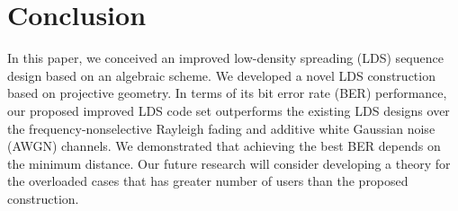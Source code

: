 \documentclass[journal,comsoc]{IEEEtran}
\begin{document}
\section{Conclusion}
\label{conclusion}
In this paper, we conceived an improved low-density spreading (LDS) sequence design based on an algebraic scheme. We developed a novel LDS construction based on projective geometry. In terms of its bit error rate (BER) performance, our proposed improved LDS code set outperforms the existing LDS designs over the frequency-nonselective Rayleigh fading and additive white Gaussian noise (AWGN) channels. We demonstrated that achieving the best BER depends on the minimum distance. Our future research will consider developing a theory for the overloaded cases that has greater number of users than the proposed construction. 



\end{document}
